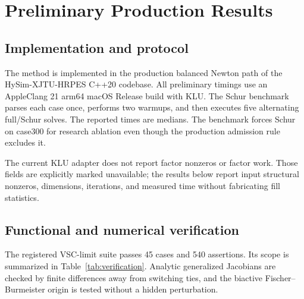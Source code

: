 \section{Preliminary Production Results}\label{sec:preliminary}

\subsection{Implementation and protocol}

The method is implemented in the production balanced Newton path of the
HySim-XJTU-HRPES C++20 codebase. All preliminary timings use an AppleClang 21
arm64 macOS Release build with KLU. The Schur benchmark parses each case once,
performs two warmups, and then executes five alternating full/Schur solves. The
reported times are medians. The benchmark forces Schur on case300 for research
ablation even though the production admission rule excludes it.

The current KLU adapter does not report factor nonzeros or factor work. Those
fields are explicitly marked unavailable; the results below report input
structural nonzeros, dimensions, iterations, and measured time without
fabricating fill statistics.

\subsection{Functional and numerical verification}

The registered VSC-limit suite passes 45 cases and 540 assertions. Its scope is
summarized in Table~\ref{tab:verification}. Analytic generalized Jacobians are
checked by finite differences away from switching ties, and the biactive
Fischer--Burmeister origin is tested without a hidden perturbation.

